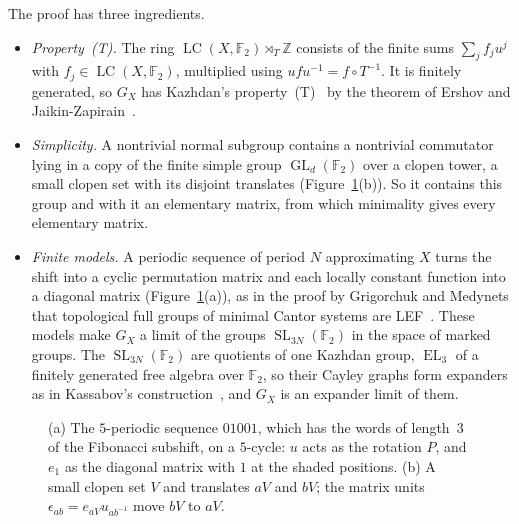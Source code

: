 \documentclass[11pt]{amsart}
\newcommand{\F}{\mathbb F}
\newcommand{\Z}{\mathbb Z}
\newcommand{\LC}{\operatorname{LC}}
\newcommand{\EL}{\operatorname{EL}}
\newcommand{\GL}{\operatorname{GL}}
\newcommand{\SL}{\operatorname{SL}}
\begin{document}
The proof has three ingredients.
\begin{itemize}
\item \emph{Property~\textup{(T)}.} The ring $\LC(X,\F_2)\rtimes_T\Z$
consists of the finite sums $\sum_jf_ju^j$ with $f_j\in\LC(X,\F_2)$,
multiplied using $ufu^{-1}=f\circ T^{-1}$. It is finitely generated, so
$G_X$ has Kazhdan's property~\textup{(T)}~\cite{Kazhdan} by the theorem of
Ershov and Jaikin-Zapirain~\cite{EJZ}.
\item \emph{Simplicity.} A nontrivial normal subgroup contains a nontrivial
commutator lying in a copy of the finite simple group $\GL_d(\F_2)$ over a
clopen tower, a small clopen set with its disjoint translates
(Figure~\ref{fig:models}(b)). So it contains this group and with it an
elementary matrix, from which minimality gives every elementary matrix.
\item \emph{Finite models.} A periodic sequence of period $N$ approximating
$X$ turns the shift into a cyclic permutation matrix and each locally
constant function into a diagonal matrix (Figure~\ref{fig:models}(a)), as
in the proof by Grigorchuk and Medynets that topological full groups of
minimal Cantor systems are LEF~\cite[Theorem~2.6]{GM}. These models make
$G_X$ a limit of the groups $\SL_{3N}(\F_2)$ in the space of marked groups.
The $\SL_{3N}(\F_2)$ are quotients of one Kazhdan group, $\EL_3$ of a
finitely generated free algebra over $\F_2$, so their Cayley graphs form
expanders as in Kassabov's construction~\cite{Kassabov}, and $G_X$ is an
expander limit of them.
\end{itemize}

\begin{figure}[t]
\centering
{}
\caption{(a) The $5$-periodic sequence $01001$, which has the words of
length~$3$ of the Fibonacci subshift, on a $5$-cycle: $u$ acts as the
rotation $P$, and $e_1$ as the diagonal matrix with $1$ at the shaded
positions. (b) A small clopen set $V$ and translates $aV$ and $bV$; the
matrix units $\epsilon_{ab}=e_{aV}u_{ab^{-1}}$ move $bV$ to $aV$.}
\label{fig:models}
\end{figure}
\end{document}
